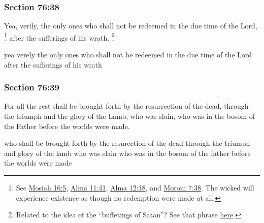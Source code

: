 
	\subsubsection{Section 76:38} %
		\label{DC76-38}

		Yea, verily, the only ones who shall not be redeemed in the due time of the Lord,%
			\footnote{%
				See \hyperref[MOSIAH-16-5]{Mosiah 16:5}, \hyperref[ALMA-11-41]{Alma 11:41}, \hyperref[ALMA-12-18]{Alma 12:18}, and \hyperref[MORONI-7-38]{Moroni 7:38}. The wicked will experience existence as though no redemption were made at all.
				}
		after the sufferings of his wrath.%
			\footnote{%
				Related to the idea of the ``buffetings of Satan''? See that phrase \hyperref[BUFFET-PHRASES]{here}.
				}

		\begin{framed}
		\scriptsize
			\begin{compactdesc}
				\item[JSP] yea verely the only ones who shall not be redeemed in the due time of the Lord after the sufferings of his wrath
			\end{compactdesc}
		\end{framed}

	\subsubsection{Section 76:39} %
		\label{DC76-39}

		For all the rest shall be brought forth by the resurrection of the dead, through the triumph and the glory of the Lamb, who was slain, who was in the bosom of the Father before the worlds were made.

		\begin{framed}
		\scriptsize
			\begin{compactdesc}
				\item[JSP] who shall be brought forth by the resurection of the dead through the triumph and glory of the lamb who was slain who was in the bosom of the father before the worlds were made
			\end{compactdesc}
		\end{framed}

